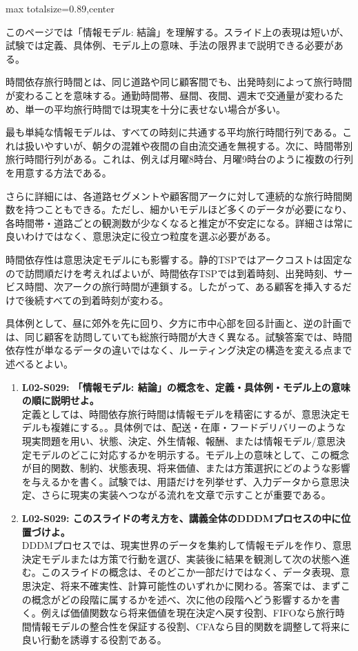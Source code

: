 \begin{minipage}[t]{0.58\textwidth}
\begin{adjustbox}{max totalsize={\textwidth}{0.89\textheight},center}
\begin{minipage}{\textwidth}\scriptsize
{}このページでは「情報モデル: 結論」を理解する。スライド上の表現は短いが、試験では定義、具体例、モデル上の意味、手法の限界まで説明できる必要がある。\par
時間依存旅行時間とは、同じ道路や同じ顧客間でも、出発時刻によって旅行時間が変わることを意味する。通勤時間帯、昼間、夜間、週末で交通量が変わるため、単一の平均旅行時間では現実を十分に表せない場合が多い。\par
最も単純な情報モデルは、すべての時刻に共通する平均旅行時間行列である。これは扱いやすいが、朝夕の混雑や夜間の自由流交通を無視する。次に、時間帯別旅行時間行列がある。これは、例えば月曜8時台、月曜9時台のように複数の行列を用意する方法である。\par
さらに詳細には、各道路セグメントや顧客間アークに対して連続的な旅行時間関数を持つこともできる。ただし、細かいモデルほど多くのデータが必要になり、各時間帯・道路ごとの観測数が少なくなると推定が不安定になる。詳細さは常に良いわけではなく、意思決定に役立つ粒度を選ぶ必要がある。\par
時間依存性は意思決定モデルにも影響する。静的TSPではアークコストは固定なので訪問順だけを考えればよいが、時間依存TSPでは到着時刻、出発時刻、サービス時間、次アークの旅行時間が連鎖する。したがって、ある顧客を挿入するだけで後続すべての到着時刻が変わる。\par
具体例として、昼に郊外を先に回り、夕方に市中心部を回る計画と、逆の計画では、同じ顧客を訪問していても総旅行時間が大きく異なる。試験答案では、時間依存性が単なるデータの違いではなく、ルーティング決定の構造を変える点まで述べるとよい。\par{}\begin{enumerate}\item \textbf{L02-S029: 「情報モデル: 結論」の概念を、定義・具体例・モデル上の意味の順に説明せよ。}\\定義としては、時間依存旅行時間は情報モデルを精密にするが、意思決定モデルも複雑にする。。具体例では、配送・在庫・フードデリバリーのような現実問題を用い、状態、決定、外生情報、報酬、または情報モデル/意思決定モデルのどこに対応するかを明示する。モデル上の意味として、この概念が目的関数、制約、状態表現、将来価値、または方策選択にどのような影響を与えるかを書く。試験では、用語だけを列挙せず、入力データから意思決定、さらに現実の実装へつながる流れを文章で示すことが重要である。\item \textbf{L02-S029: このスライドの考え方を、講義全体のDDDMプロセスの中に位置づけよ。}\\DDDMプロセスでは、現実世界のデータを集約して情報モデルを作り、意思決定モデルまたは方策で行動を選び、実装後に結果を観測して次の状態へ進む。このスライドの概念は、そのどこか一部だけではなく、データ表現、意思決定、将来不確実性、計算可能性のいずれかに関わる。答案では、まずこの概念がどの段階に属するかを述べ、次に他の段階へどう影響するかを書く。例えば価値関数なら将来価値を現在決定へ戻す役割、FIFOなら旅行時間情報モデルの整合性を保証する役割、CFAなら目的関数を調整して将来に良い行動を誘導する役割である。\end{enumerate}

\end{minipage}
\end{adjustbox}
\end{minipage}
